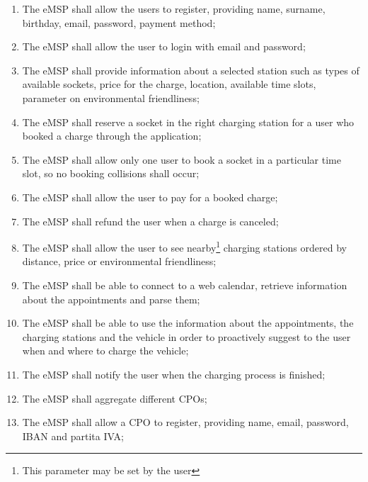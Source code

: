\begin{enumerate}[label=\textbf{R\arabic*}]
    \item The \ac{eMSP} shall allow the users to register, providing name, surname, birthday, email, password, payment method;\label{req:eMSP-user-registration}
    \item The \ac{eMSP} shall allow the user to login with email and password;\label{req:eMSP-user-login}
    \item The \ac{eMSP} shall provide information about a selected station such as types of available sockets, price for the charge, location, available time slots, parameter on environmental friendliness;\label{req:eMSP-info-station}
    \item The \ac{eMSP} shall reserve a socket in the right charging station for a user who booked a charge through the application;\label{req:eMSP-reserve-socket}
    \item The \ac{eMSP} shall allow only one user to book a socket in a particular time slot, so no booking collisions shall occur;\label{req:eMSP-no-book-collisions}
    \item The \ac{eMSP} shall allow the user to pay for a booked charge;\label{req:eMSP-payment}
    \item The \ac{eMSP} shall refund the user when a charge is canceled;\label{req:eMSP-refund}
    \item The \ac{eMSP} shall allow the user to see nearby\footnote{This parameter may be set by the user} charging stations ordered by distance, price or environmental friendliness;\label{req:eMSP-see-stations}
    \item The \ac{eMSP} shall be able to connect to a web calendar, retrieve information about the appointments and parse them;\label{req:eMSP-connect-calendar}
    \item The \ac{eMSP} shall be able to use the information about the appointments, the charging stations and the vehicle in order to proactively suggest to the user when and where to charge the vehicle;\label{req:eMSP-proactive-suggestions}
    \item The \ac{eMSP} shall notify the user when the charging process is finished;\label{req:eMSP-notification}
    \item The \ac{eMSP} shall aggregate different \acp{CPO};\label{req:eMSP-compatible}
    \item The \ac{eMSP} shall allow a \ac{CPO} to register, providing name, email, password, \ac{IBAN} and \gls{partita IVA};\label{req:eMSP-cpo-registration}

\end{enumerate}
